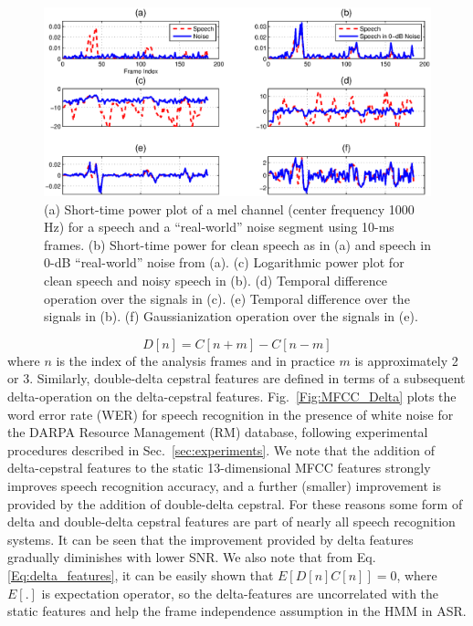 \documentclass{article}
\begin{document}
\begin{figure}[]
\centering
\includegraphics[width=1\textwidth]{deltaspectra_cepstra2.eps}
\caption{(a) Short-time power plot of a mel channel (center frequency 1000 Hz) for a speech and a ``real-world'' noise
segment using 10-ms frames.   (b) Short-time power for clean speech as in (a) and speech in  0-dB ``real-world'' noise from (a).
(c) Logarithmic power plot for clean speech and noisy speech in (b). (d) Temporal difference operation over
the signals in (c). (e) Temporal difference over the signals in (b). (f) Gaussianization operation over the signals in (e).}
\label{Fig:delta-samsung}
\end{figure}

\begin{equation}\label{Eq:delta_features}
D[n] = C[n+m] - C[n-m]
\end{equation}
where $n$ is the index of the analysis frames and in practice $m$ is approximately  2 or 3. Similarly, double-delta cepstral features are defined in terms of a subsequent delta-operation on the delta-cepstral features. Fig.~\ref{Fig:MFCC_Delta} plots the word error rate (WER) for speech recognition in the presence of white noise for the  DARPA Resource Management (RM) database, following experimental procedures described in Sec.~\ref{sec:experiments}. We note that the addition of delta-cepstral features to the static 13-dimensional MFCC features strongly improves speech recognition accuracy, and a further (smaller) improvement is provided by the addition of  double-delta cepstral. For these reasons some form of delta and double-delta cepstral features are part of nearly   all   speech recognition systems.  It can be seen that the improvement provided by delta features gradually
diminishes with lower SNR.  We also note that from Eq. \eqref{Eq:delta_features}, it can be easily shown that $E[D[n]C[n]] = 0$, where $E[.]$ is expectation operator, so the delta-features are uncorrelated with the static features and help the frame independence assumption in the HMM in ASR.
\end{document}
